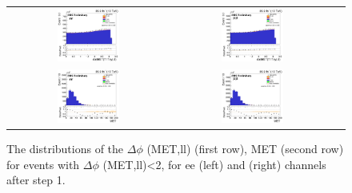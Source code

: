 \begin{figure}[ht]
  \begin{center}
    \begin{tabular}{ccc}
      \includegraphics[width=0.4\textwidth]{figures/tW/fig/Step1/ee_noNvtx/H_MET_Z_T1Txy_phi.png}&
      \includegraphics[width=0.4\textwidth]{figures/tW/fig/Step1/mumu_noNvtx/H_MET_Z_T1Txy_phi.png}\\
      \includegraphics[width=0.4\textwidth]{figures/tW/fig/ee_H_MET_Et.png}&
      \includegraphics[width=0.4\textwidth]{figures/tW/fig/mumu_H_MET_Et.png}\\
    \end{tabular}
    \caption{The distributions of the $\Delta \phi$ (MET,ll) (first row), MET (second row) for events with $\Delta \phi$ (MET,ll)<2, for ee (left) and \mumu (right) channels after step 1.
    \label{fig:step1_H_MET_Z_T1Txy_phi}}
  \end{center}
\end{figure}

